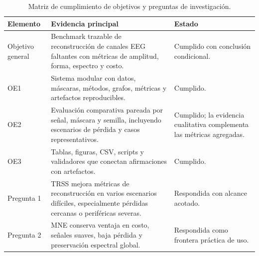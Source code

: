 \begin{table}[htbp]
\centering
\small
\caption{Matriz de cumplimiento de objetivos y preguntas de investigación.}
\label{tab:ch8_objective_evidence}
\begin{tabular}{@{}p{2.4cm}p{5.4cm}p{3.7cm}@{}}
\toprule
Elemento & Evidencia principal & Estado \\
\midrule
Objetivo general & Benchmark trazable de reconstrucción de canales EEG faltantes con métricas de amplitud, forma, espectro y costo. & Cumplido con conclusión condicional. \\
OE1 & Sistema modular con datos, máscaras, métodos, grafos, métricas y artefactos reproducibles. & Cumplido. \\
OE2 & Evaluación comparativa pareada por señal, máscara y semilla, incluyendo escenarios de pérdida y casos representativos. & Cumplido; la evidencia cualitativa complementa las métricas agregadas. \\
OE3 & Tablas, figuras, CSV, scripts y validadores que conectan afirmaciones con artefactos. & Cumplido. \\
Pregunta 1 & TRSS mejora métricas de reconstrucción en varios escenarios difíciles, especialmente pérdidas cercanas o periféricas severas. & Respondida con alcance acotado. \\
Pregunta 2 & MNE conserva ventaja en costo, señales suaves, baja pérdida y preservación espectral global. & Respondida como frontera práctica de uso. \\
\bottomrule
\end{tabular}
\end{table}

